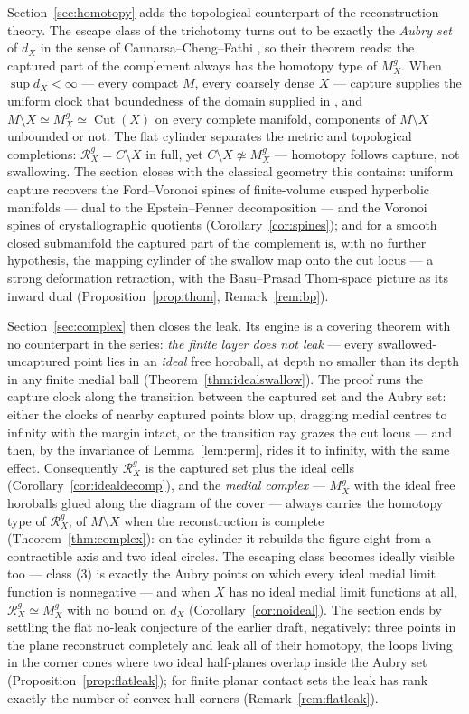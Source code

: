 \documentclass[11pt]{article}
\theoremstyle{remark}
\newcommand{\X}{X}
\newcommand{\Mg}{M^{g}_{\X}}
\newcommand{\Rg}{\mathcal{R}^{g}_{\X}}
\newcommand{\dX}{d_{\X}}
\newcommand{\Cut}{\operatorname{Cut}}
\begin{document}
Section~\ref{sec:homotopy} adds the topological counterpart of the
reconstruction theory. The escape class of the trichotomy turns out
to be exactly the \emph{Aubry set} of $\dX$ in the sense of
Cannarsa--Cheng--Fathi \cite{CCF}, so their theorem reads: the
captured part of the complement always has the homotopy type of
$\Mg$. When $\sup\dX<\infty$ --- every compact $M$, every coarsely
dense $\X$ --- capture supplies the uniform clock that boundedness of
the domain supplied in \cite{Lie,ACNS}, and
$M\setminus\X\simeq\Mg\simeq\Cut(\X)$ on every complete manifold,
components of $M\setminus\X$ unbounded or not. The flat cylinder
separates the metric and topological completions: $\Rg=C\setminus\X$
in full, yet $C\setminus\X\not\simeq\Mg$ --- homotopy follows
capture, not swallowing. The section closes with the classical
geometry this contains: uniform capture recovers the Ford--Voronoi
spines of finite-volume cusped hyperbolic manifolds --- dual to the
Epstein--Penner decomposition \cite{EP} --- and the Voronoi spines
of crystallographic quotients (Corollary~\ref{cor:spines}); and for
a smooth closed submanifold the captured part of the complement is,
with no further hypothesis, the mapping cylinder of the swallow map
onto the cut locus --- a strong deformation retraction, with the
Basu--Prasad Thom-space picture as its inward dual
(Proposition~\ref{prop:thom}, Remark~\ref{rem:bp}).

Section~\ref{sec:complex} then closes the leak. Its engine is a
covering theorem with no counterpart in the series: \emph{the
finite layer does not leak} --- every swallowed-uncaptured point
lies in an \emph{ideal} free horoball, at depth no smaller than its
depth in any finite medial ball
(Theorem~\ref{thm:idealswallow}). The proof runs the capture clock
along the transition between the captured set and the Aubry set:
either the clocks of nearby captured points blow up, dragging
medial centres to infinity with the margin intact, or the
transition ray grazes the cut locus --- and then, by the invariance
of Lemma~\ref{lem:perm}, rides it to infinity, with the same
effect. Consequently $\Rg$ is the captured set plus the ideal
cells (Corollary~\ref{cor:idealdecomp}), and the \emph{medial
complex} --- $\Mg$ with the ideal free horoballs glued along the
diagram of the cover --- always carries the homotopy type of
$\Rg$, of $M\setminus\X$ when the reconstruction is complete
(Theorem~\ref{thm:complex}): on the cylinder it rebuilds the
figure-eight from a contractible axis and two ideal circles. The
escaping class becomes ideally visible too --- class (3) is exactly
the Aubry points on which every ideal medial limit function is
nonnegative --- and when $\X$ has no ideal medial limit functions
at all, $\Rg\simeq\Mg$ with no bound on $\dX$
(Corollary~\ref{cor:noideal}). The section ends by settling the
flat no-leak conjecture of the earlier draft, negatively: three
points in the plane reconstruct completely and leak all of their
homotopy, the loops living in the corner cones where two ideal
half-planes overlap inside the Aubry set
(Proposition~\ref{prop:flatleak}); for finite planar contact sets
the leak has rank exactly the number of convex-hull corners
(Remark~\ref{rem:flatleak}).
\end{document}
